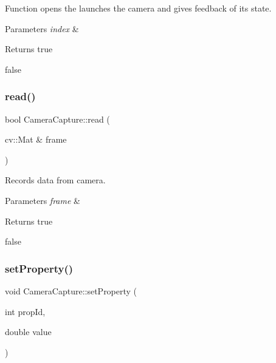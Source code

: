 Function opens the launches the camera and gives feedback of its state. 


\begin{DoxyParams}{Parameters}
{\em index} & \\
\hline
\end{DoxyParams}
\begin{DoxyReturn}{Returns}
true 

false 
\end{DoxyReturn}
\mbox{\label{classCameraCapture_a3a1d86aca613881d8cd06d3f7b85440f}} 
\subsubsection{\texorpdfstring{read()}{read()}}
{\footnotesize\ttfamily bool Camera\+Capture\+::read (\begin{DoxyParamCaption}\item[{cv\+::\+Mat \&}]{frame }\end{DoxyParamCaption})}



Records data from camera. 


\begin{DoxyParams}{Parameters}
{\em frame} & \\
\hline
\end{DoxyParams}
\begin{DoxyReturn}{Returns}
true 

false 
\end{DoxyReturn}
\mbox{\label{classCameraCapture_af82994a1857ad331f8d9d24b3ae24962}} 
\subsubsection{\texorpdfstring{set\+Property()}{setProperty()}}
{\footnotesize\ttfamily void Camera\+Capture\+::set\+Property (\begin{DoxyParamCaption}\item[{int}]{prop\+Id,  }\item[{double}]{value }\end{DoxyParamCaption})}



